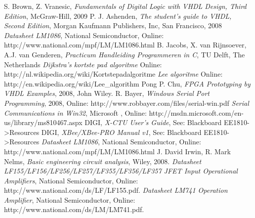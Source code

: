 \begin{thebibliography}{99}
		S. Brown, Z. Vranesic, \emph{Fundamentals of Digital Logic with VHDL Design, Third Edition}, McGraw-Hill, 2009
		P. J. Ashenden, \emph{The student's guide to VHDL, Second Edition}, Morgan Kaufmann Publishers, Inc, San Francisco, 2008
	 \emph{Datasheet LM1086}, National Semiconductor, Online: http://www.national.com/mpf/LM/LM1086.html
	 B. Jacobs, X. van Rijnsoever, A.J. van Genderen, \emph{Practicum Handleiding Programmeren in C}, TU Delft, The Netherlands
	 \emph{Dijkstra's kortste pad algoritme} Online: http://nl.wikipedia.org/wiki/Kortstepadalgoritme
	 \emph{Lee algoritme} Online: http://en.wikipedia.org/wiki/Lee\_algorithm
		Pong P. Chu, \emph{FPGA Prototyping by VHDL Examples}, 2008, John Wiley.
		R. Bayer, \emph{Windows Serial Port Programming}, 2008, Online: http://www.robbayer.com/files/serial-win.pdf
	 \emph{Serial Communications in Win32}, Microsoft , Online: http://msdn.microsoft.com/en-us/library/ms810467.aspx
		DIGI, \emph{X-CTU User's Guide}, See: Blackboard EE1810->Resources
		DIGI, \emph{XBee/XBee-PRO Manual v1}, See: Blackboard EE1810->Resources
	 \emph{Datasheet LM1086}, National Semiconductor, Online: http://www.national.com/mpf/LM/LM1086.html
		 	J. David Irwin, R. Mark Nelms, \emph{Basic engineering circuit analysis}, Wiley, 2008.
	 \emph{Datasheet LF155/LF156/LF256/LF257/LF355/LF356/LF357 JFET Input Operational Amplifiers}, National Semiconductor, Online: http://www.national.com/ds/LF/LF155.pdf.
	 \emph{Datasheet LM741 Operation Amplifier}, National Semiconductor, Online: http://www.national.com/ds/LM/LM741.pdf.
\end{thebibliography}
